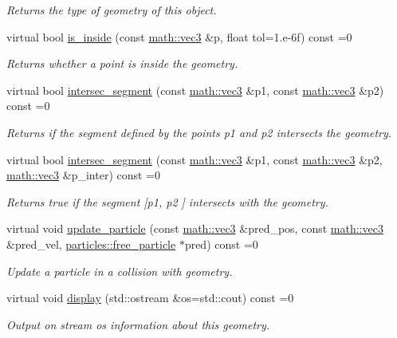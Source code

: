 \begin{DoxyCompactItemize}
\begin{DoxyCompactList}\small\item\em Returns the type of geometry of this object. \end{DoxyCompactList}\item 
virtual bool \hyperlink{classphysim_1_1geom_1_1geometry_ab7aa1a32927e96ed384a93b84fbd62b7}{is\+\_\+inside} (const \hyperlink{structphysim_1_1math_1_1vec3}{math\+::vec3} \&p, float tol=1.e-\/6f) const =0
\begin{DoxyCompactList}\small\item\em Returns whether a point is inside the geometry. \end{DoxyCompactList}\item 
virtual bool \hyperlink{classphysim_1_1geom_1_1geometry_a53c1fce565d593550f8022118f2bc3a3}{intersec\+\_\+segment} (const \hyperlink{structphysim_1_1math_1_1vec3}{math\+::vec3} \&p1, const \hyperlink{structphysim_1_1math_1_1vec3}{math\+::vec3} \&p2) const =0
\begin{DoxyCompactList}\small\item\em Returns if the segment defined by the points {\itshape p1} and {\itshape p2} intersects the geometry. \end{DoxyCompactList}\item 
virtual bool \hyperlink{classphysim_1_1geom_1_1geometry_a0870a4892819489b7e830663a3f582b8}{intersec\+\_\+segment} (const \hyperlink{structphysim_1_1math_1_1vec3}{math\+::vec3} \&p1, const \hyperlink{structphysim_1_1math_1_1vec3}{math\+::vec3} \&p2, \hyperlink{structphysim_1_1math_1_1vec3}{math\+::vec3} \&p\+\_\+inter) const =0
\begin{DoxyCompactList}\small\item\em Returns true if the segment \mbox{[}{\itshape p1}, {\itshape p2} \mbox{]} intersects with the geometry. \end{DoxyCompactList}\item 
virtual void \hyperlink{classphysim_1_1geom_1_1geometry_a01084372e5fd738636a31b151918e7dd}{update\+\_\+particle} (const \hyperlink{structphysim_1_1math_1_1vec3}{math\+::vec3} \&pred\+\_\+pos, const \hyperlink{structphysim_1_1math_1_1vec3}{math\+::vec3} \&pred\+\_\+vel, \hyperlink{classphysim_1_1particles_1_1free__particle}{particles\+::free\+\_\+particle} $\ast$pred) const =0
\begin{DoxyCompactList}\small\item\em Update a particle in a collision with geometry. \end{DoxyCompactList}\item 
\mbox{\label{classphysim_1_1geom_1_1geometry_a644ab6de2b3007feb97f75e3c468c33e}} 
virtual void \hyperlink{classphysim_1_1geom_1_1geometry_a644ab6de2b3007feb97f75e3c468c33e}{display} (std\+::ostream \&os=std\+::cout) const =0
\begin{DoxyCompactList}\small\item\em Output on stream {\itshape os} information about this geometry. \end{DoxyCompactList}\end{DoxyCompactItemize}


